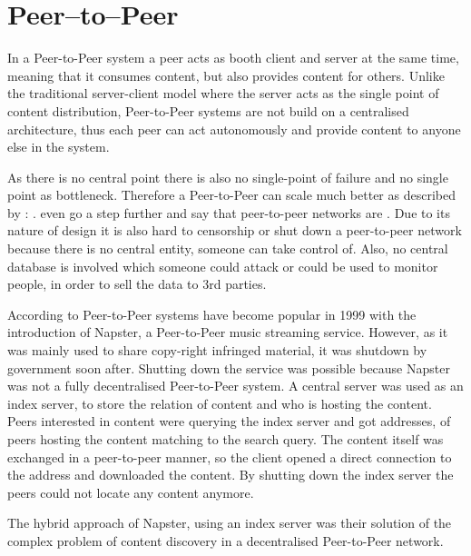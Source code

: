 \section{Peer–to–Peer}\label{sec:peer-to-peer}

In a Peer-to-Peer system a peer acts as booth client and server at the same time, meaning that it consumes content, but also provides content for others. Unlike the traditional server-client model where the server acts as the single point of content distribution, Peer-to-Peer systems are not build on a centralised architecture, thus each peer can act autonomously and provide content to anyone else in the system.

As there is no central point there is also no single-point of failure and no single point as bottleneck. Therefore a Peer-to-Peer can scale much better as described by \citet[\S1]{newscast-gossiping}:
. \citet[\S7.5.4]{tanenbaum_wetherall_2011} even go a step further and say that peer-to-peer networks are .
Due to its nature of design it is also hard to censorship or shut down a peer-to-peer network because there is no central entity, someone can take control of. Also, no central database is involved which someone could attack or could be used to monitor people, in order to sell the data to 3rd parties.

According to \citet{tanenbaum_wetherall_2011} Peer-to-Peer systems have become popular in 1999 with the introduction of Napster, a Peer-to-Peer music streaming service. However, as it was mainly used to share copy-right infringed material, it was shutdown by government soon after. Shutting down the service was possible because Napster was not a fully decentralised Peer-to-Peer system. A central server was used as an index server, to store the relation of content and who is hosting the content. Peers interested in content were querying the index server and got addresses, of peers hosting the content matching to the search query. The content itself was exchanged in a peer-to-peer manner, so the client opened a direct connection to the address and downloaded the content. By shutting down the index server the peers could not locate any content anymore. 

The hybrid approach of Napster, using an index server was their solution of the complex problem of content discovery in a decentralised Peer-to-Peer network.

